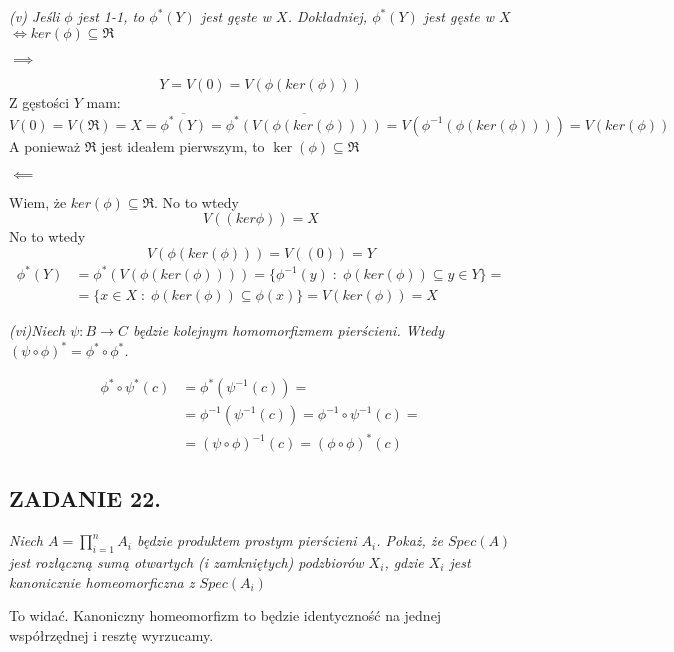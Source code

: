 \documentclass{article}
\begin{document}
\emph{\color{yellow}(v) Jeśli $\phi$ jest 1-1, to $\phi^*(Y)$ jest gęste w $X$. Dokładniej, $\phi^*(Y)$ jest gęste w $X$ $\iff ker(\phi)\subseteq\mathfrak{R}$}

$\implies$

$$Y=V(0)=V(\phi(ker(\phi)))$$
Z gęstości $Y$ mam:
$$V(0)=V(\mathfrak{R})=X=\overline{\phi^*(Y)}=\overline{\phi^*(V(\phi(ker(\phi))))}=V(\phi^{-1}(\phi(ker(\phi))))=V(ker(\phi))$$
A ponieważ $\mathfrak{R}$ jest ideałem pierwszym, to $\ker(\phi)\subseteq\mathfrak{R}$

$\impliedby$

Wiem, że $ker(\phi)\subseteq\mathfrak{R}$. No to wtedy
$$V((ker\phi))=X$$
No to wtedy
$$V(\phi(ker(\phi)))=V((0))=Y$$
\begin{align*}
    \phi^*(Y)&=\phi^*(V(\phi(ker(\phi))))=\{\phi^{-1}(y)\;:\;\phi(ker(\phi))\subseteq y\in Y\}=\\
    &=\{x\in X\;:\;\phi(ker(\phi))\subseteq\phi(x)\}=V(ker(\phi))=X
\end{align*}

\emph{\color{orange}(vi)Niech $\psi:B\to C$ będzie kolejnym homomorfizmem pierścieni. Wtedy $(\psi\circ\phi)^*=\phi^*\circ\phi^*$.}

\begin{center}
\end{center}

\begin{align*}
    \phi^*\circ\psi^*(c)&=\phi^*(\psi^{-1}(c))=\\
    &=\phi^{-1}(\psi^{-1}(c))=\phi^{-1}\circ\psi^{-1}(c)=\\
    &=(\psi\circ\phi)^{-1}(c)=(\phi\circ\phi)^*(c)
\end{align*}

\subsection*{ZADANIE 22.}
\emph{\color{yellow}Niech $A=\prod\limits_{i=1}^nA_i$ będzie produktem prostym pierścieni $A_i$. Pokaż, że $Spec(A)$ jest rozłączną sumą otwartych (i zamkniętych) podzbiorów $X_i$, gdzie $X_i$ jest kanonicznie homeomorficzna z $Spec(A_i)$}

To widać. Kanoniczny homeomorfizm to będzie identyczność na jednej współrzędnej i resztę wyrzucamy. 
\end{document}
